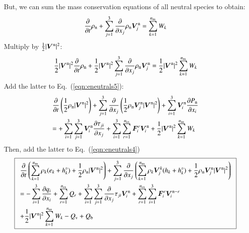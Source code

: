 \documentclass{warpdoc}
\newcommand\frameeqn[1]{\fbox{$\displaystyle #1$}}
\newcommand{\alb}{\vspace{0.1cm}\\} %
\newcommand{\mfd}{\displaystyle}
\newcommand{\nns}{{n_{\rm ns}}}
\newcommand{\ncs}{{n_{\rm cs}}}
\renewcommand{\vec}[1]{\bm{#1}}
\begin{document}
%
But, we can sum the mass conservation equations of all neutral species to obtain:
%
\begin{equation}
 \frac{\partial }{\partial t}\rho_{\rm n} + \sum_{j=1}^3 \frac{\partial }{\partial x_j} \rho_{\rm n} \vec{V}_j^{\rm n} = \sum_{k=1}^\nns W_k
\end{equation}
%
Multiply by $\frac{1}{2}|\vec{V}^{\rm n}|^2$:
%
\begin{equation}
 \frac{1}{2}|\vec{V}^{\rm n}|^2\frac{\partial }{\partial t}\rho_{\rm n} 
+ \frac{1}{2}|\vec{V}^{\rm n}|^2 \sum_{j=1}^3 \frac{\partial }{\partial x_j} \rho_{\rm n} \vec{V}_j^{\rm n} 
= \frac{1}{2}|\vec{V}^{\rm n}|^2 \sum_{k=1}^\nns W_k
\end{equation}
%
Add the latter to Eq.\ (\ref{eqn:eneutrals5}):
%
\begin{equation}
\begin{array}{l}\mfd
     \frac{\partial  }{\partial t}\left( \frac{1}{2}\rho_{\rm n}|\vec{V}^{\rm n}|^2\right)
+  \sum_{j=1}^3   \frac{\partial }{\partial x_j}\left(\frac{1}{2}\rho_{\rm n} \vec{V}_j^{\rm n} |\vec{V}^{\rm n}|^2\right)
+ \sum_{i=1}^3 \vec{V}_i^{\rm n} \frac{\partial P_{\rm n}}{\partial x_i} 
\alb\mfd
=
+ \sum_{i=1}^3 \sum_{j=1}^3 \vec{V}_i^{\rm n} \frac{\partial \tau_{ji}}{\partial x_j}
+ \sum_{i=1}^3 \sum_{r=1}^\ncs \vec{F}_i^r \vec{V}_i^{\rm n}
+\frac{1}{2}|\vec{V}^{\rm n}|^2 \sum_{k=1}^\nns W_k
\end{array}
\label{eneutrals6}
\end{equation}
%
Then, add the latter to Eq.\ (\ref{eqn:eneutrals4})
%
\begin{equation}
\frameeqn{
\begin{array}{l}\mfd
 \frac{\partial }{\partial t}\left(\sum_{k=1}^\nns \rho_k (e_k+h_k^\circ)+\frac{1}{2}\rho_{\rm n}|\vec{V}^{\rm n}|^2 \right) 
+ \sum_{j=1}^3  \frac{\partial }{\partial x_j} \left(\sum_{k=1}^\nns \rho_k \vec{V}^k_j (h_k+h_k^\circ)+\frac{1}{2}\rho_{\rm n}\vec{V}^{\rm n}_j|\vec{V}^{\rm n}|^2 \right)\alb\mfd
= 
-\sum_{i=1}^{3}\frac{\partial q_i}{\partial x_i}
+\sum_{r=1}^{\ncs} Q_{r}
+\sum_{i=1}^3 \sum_{j=1}^3  \frac{\partial }{\partial x_j} \tau_{ji} \vec{V}_i^{\rm n}
+ \sum_{r=1}^\ncs \sum_{i=1}^3 \vec{F}_i^{r} \vec{V}_i^{{\rm n}-r} \alb\mfd
+\frac{1}{2}|\vec{V}^{\rm n}|^2 \sum_{k=1}^\nns W_k
-  Q_{\rm v}
+ Q_{\rm b}
\end{array}
}
\label{eqn:eneutrals7}
\end{equation}
%  
\end{document}
